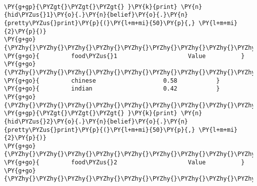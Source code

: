\begin{example}
\begin{Verbatim}[commandchars=\\\{\}]

\PY{g+gp}{\PYZgt{}\PYZgt{}\PYZgt{} }\PY{k}{print} \PY{n}{hid\PYZus{}1}\PY{o}{.}\PY{n}{belief}\PY{o}{.}\PY{n}{pretty\PYZus{}print}\PY{p}{(}\PY{l+m+mi}{50}\PY{p}{,} \PY{l+m+mi}{2}\PY{p}{)}
\PY{g+go}{\PYZhy{}\PYZhy{}\PYZhy{}\PYZhy{}\PYZhy{}\PYZhy{}\PYZhy{}\PYZhy{}\PYZhy{}\PYZhy{}\PYZhy{}\PYZhy{}\PYZhy{}\PYZhy{}\PYZhy{}\PYZhy{}\PYZhy{}\PYZhy{}\PYZhy{}\PYZhy{}\PYZhy{}\PYZhy{}\PYZhy{}\PYZhy{}\PYZhy{}\PYZhy{}\PYZhy{}\PYZhy{}\PYZhy{}\PYZhy{}\PYZhy{}\PYZhy{}\PYZhy{}\PYZhy{}\PYZhy{}\PYZhy{}\PYZhy{}\PYZhy{}\PYZhy{}\PYZhy{}\PYZhy{}\PYZhy{}\PYZhy{}\PYZhy{}\PYZhy{}\PYZhy{}\PYZhy{}\PYZhy{}\PYZhy{}\PYZhy{}}
\PY{g+go}{         food\PYZus{}1                    Value          }
\PY{g+go}{\PYZhy{}\PYZhy{}\PYZhy{}\PYZhy{}\PYZhy{}\PYZhy{}\PYZhy{}\PYZhy{}\PYZhy{}\PYZhy{}\PYZhy{}\PYZhy{}\PYZhy{}\PYZhy{}\PYZhy{}\PYZhy{}\PYZhy{}\PYZhy{}\PYZhy{}\PYZhy{}\PYZhy{}\PYZhy{}\PYZhy{}\PYZhy{}\PYZhy{}\PYZhy{}\PYZhy{}\PYZhy{}\PYZhy{}\PYZhy{}\PYZhy{}\PYZhy{}\PYZhy{}\PYZhy{}\PYZhy{}\PYZhy{}\PYZhy{}\PYZhy{}\PYZhy{}\PYZhy{}\PYZhy{}\PYZhy{}\PYZhy{}\PYZhy{}\PYZhy{}\PYZhy{}\PYZhy{}\PYZhy{}\PYZhy{}\PYZhy{}}
\PY{g+go}{         chinese                   0.58           }
\PY{g+go}{         indian                    0.42           }
\PY{g+go}{\PYZhy{}\PYZhy{}\PYZhy{}\PYZhy{}\PYZhy{}\PYZhy{}\PYZhy{}\PYZhy{}\PYZhy{}\PYZhy{}\PYZhy{}\PYZhy{}\PYZhy{}\PYZhy{}\PYZhy{}\PYZhy{}\PYZhy{}\PYZhy{}\PYZhy{}\PYZhy{}\PYZhy{}\PYZhy{}\PYZhy{}\PYZhy{}\PYZhy{}\PYZhy{}\PYZhy{}\PYZhy{}\PYZhy{}\PYZhy{}\PYZhy{}\PYZhy{}\PYZhy{}\PYZhy{}\PYZhy{}\PYZhy{}\PYZhy{}\PYZhy{}\PYZhy{}\PYZhy{}\PYZhy{}\PYZhy{}\PYZhy{}\PYZhy{}\PYZhy{}\PYZhy{}\PYZhy{}\PYZhy{}\PYZhy{}\PYZhy{}}
\PY{g+gp}{\PYZgt{}\PYZgt{}\PYZgt{} }\PY{k}{print} \PY{n}{hid\PYZus{}2}\PY{o}{.}\PY{n}{belief}\PY{o}{.}\PY{n}{pretty\PYZus{}print}\PY{p}{(}\PY{l+m+mi}{50}\PY{p}{,} \PY{l+m+mi}{2}\PY{p}{)}
\PY{g+go}{\PYZhy{}\PYZhy{}\PYZhy{}\PYZhy{}\PYZhy{}\PYZhy{}\PYZhy{}\PYZhy{}\PYZhy{}\PYZhy{}\PYZhy{}\PYZhy{}\PYZhy{}\PYZhy{}\PYZhy{}\PYZhy{}\PYZhy{}\PYZhy{}\PYZhy{}\PYZhy{}\PYZhy{}\PYZhy{}\PYZhy{}\PYZhy{}\PYZhy{}\PYZhy{}\PYZhy{}\PYZhy{}\PYZhy{}\PYZhy{}\PYZhy{}\PYZhy{}\PYZhy{}\PYZhy{}\PYZhy{}\PYZhy{}\PYZhy{}\PYZhy{}\PYZhy{}\PYZhy{}\PYZhy{}\PYZhy{}\PYZhy{}\PYZhy{}\PYZhy{}\PYZhy{}\PYZhy{}\PYZhy{}\PYZhy{}\PYZhy{}}
\PY{g+go}{         food\PYZus{}2                    Value          }
\PY{g+go}{\PYZhy{}\PYZhy{}\PYZhy{}\PYZhy{}\PYZhy{}\PYZhy{}\PYZhy{}\PYZhy{}\PYZhy{}\PYZhy{}\PYZhy{}\PYZhy{}\PYZhy{}\PYZhy{}\PYZhy{}\PYZhy{}\PYZhy{}\PYZhy{}\PYZhy{}\PYZhy{}\PYZhy{}\PYZhy{}\PYZhy{}\PYZhy{}\PYZhy{}\PYZhy{}\PYZhy{}\PYZhy{}\PYZhy{}\PYZhy{}\PYZhy{}\PYZhy{}\PYZhy{}\PYZhy{}\PYZhy{}\PYZhy{}\PYZhy{}\PYZhy{}\PYZhy{}\PYZhy{}\PYZhy{}\PYZhy{}\PYZhy{}\PYZhy{}\PYZhy{}\PYZhy{}\PYZhy{}\PYZhy{}\PYZhy{}\PYZhy{}}

\end{Verbatim}
\end{example}
